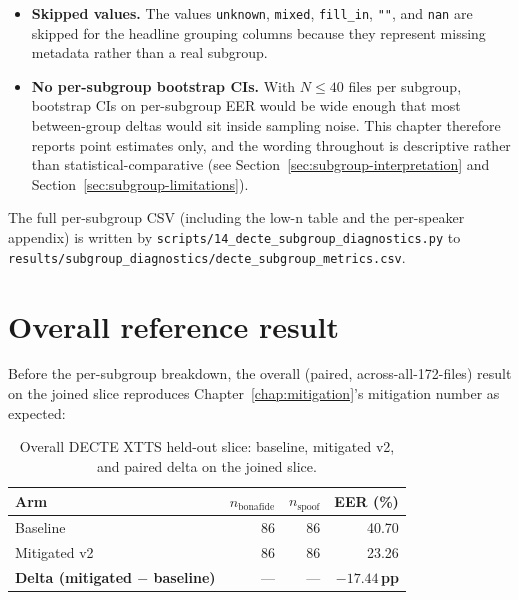 \begin{itemize}
        headline claim in the chapter (Chapter~\ref{chap:data-methodology}, Section~\ref{sec:methodology-subgroups-threshold}).
    \item \textbf{Skipped values.} The values \texttt{unknown}, \texttt{mixed}, \texttt{fill\_in},
        \texttt{""}, and \texttt{nan} are skipped for the headline grouping columns
        because they represent missing metadata rather than a real
        subgroup.
    \item \textbf{No per-subgroup bootstrap CIs.} With $N \leq 40$ files per
        subgroup, bootstrap CIs on per-subgroup EER would be wide
        enough that most between-group deltas would sit inside sampling
        noise. This chapter therefore reports point estimates only, and
        the wording throughout is descriptive rather than
        statistical-comparative (see Section~\ref{sec:subgroup-interpretation} and Section~\ref{sec:subgroup-limitations}).
\end{itemize}

The full per-subgroup CSV (including the low-n table and the
per-speaker appendix) is written by
\texttt{scripts/14\_decte\_subgroup\_diagnostics.py} to
\texttt{results/subgroup\_diagnostics/decte\_subgroup\_metrics.csv}.


\section{Overall reference result}
\label{sec:subgroup-overall}

Before the per-subgroup breakdown, the overall (paired,
across-all-172-files) result on the joined slice reproduces
Chapter~\ref{chap:mitigation}'s mitigation number as expected:

\begin{table}[t]
\centering
\caption{Overall DECTE XTTS held-out slice: baseline, mitigated v2, and paired delta on the joined slice.}
\label{tab:subgroup-overall}
\begin{tabularx}{\linewidth}{X r r r}
\toprule
\textbf{Arm} & \textbf{$n_\text{bonafide}$} & \textbf{$n_\text{spoof}$} & \textbf{EER (\%)} \\
\midrule
Baseline & 86 & 86 & 40.70 \\
Mitigated v2 & 86 & 86 & 23.26 \\
\textbf{Delta (mitigated $-$ baseline)} & --- & --- & $\mathbf{-17.44}$\,\textbf{pp} \\
\bottomrule
\end{tabularx}
\end{table}

